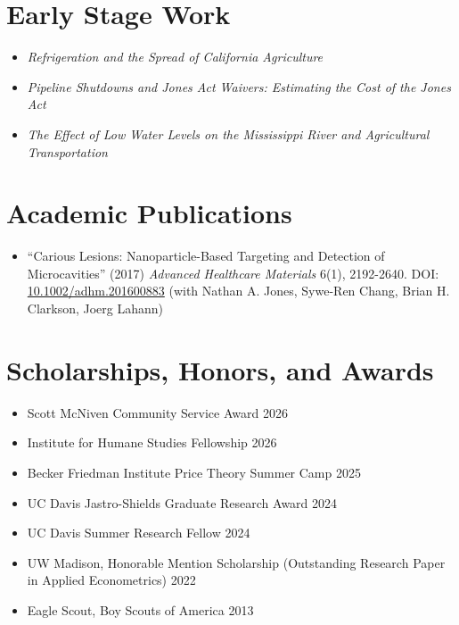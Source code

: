 \documentclass{article}[12]
\begin{document}
\section{Early Stage Work}
\begin{itemize}
    \item \textit{Refrigeration and the Spread of California Agriculture}

    \item \textit{Pipeline Shutdowns and Jones Act Waivers: Estimating the Cost of the Jones Act}

    \item \textit{The Effect of Low Water Levels on the Mississippi River and Agricultural Transportation}
\end{itemize}
\section{Academic Publications}

\begin{itemize}
    \item ``Carious Lesions: Nanoparticle-Based Targeting and Detection of Microcavities'' (2017) \emph{Advanced Healthcare Materials} 6(1), 2192-2640. DOI: \url{10.1002/adhm.201600883} (with Nathan A. Jones, Sywe-Ren Chang, Brian H. Clarkson, Joerg Lahann)
\end{itemize}


\section{Scholarships, Honors, and Awards}

\begin{itemize}   
    \item Scott McNiven Community Service Award \hfill 2026
    \item Institute for Humane Studies Fellowship \hfill 2026
    \item Becker Friedman Institute Price Theory Summer Camp \hfill 2025
    \item UC Davis Jastro-Shields Graduate Research Award \hfill 2024
    \item UC Davis Summer Research Fellow \hfill 2024
    \item UW Madison, Honorable Mention Scholarship (Outstanding Research Paper in Applied Econometrics) \hfill 2022 
    \item Eagle Scout, Boy Scouts of America \hfill 2013 
\end{itemize}
\end{document}
